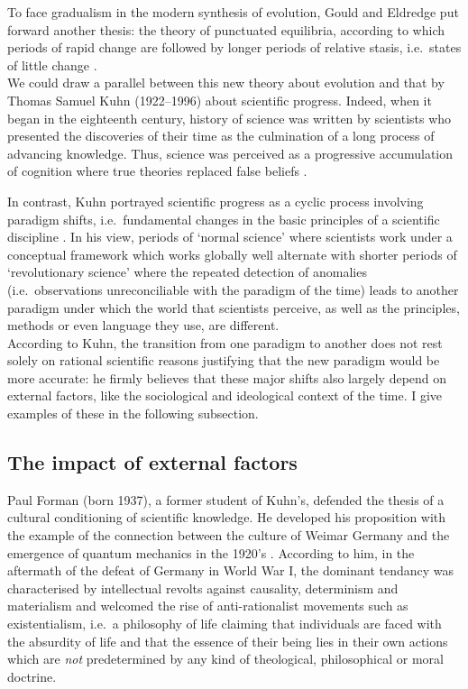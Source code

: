 To face gradualism in the modern synthesis of evolution, Gould and Eldredge put forward another thesis: the theory of punctuated equilibria, according to which periods of rapid change are followed by longer periods of relative stasis, i.e.\ states of little change \citep{gould1972punctuated}.\\

We could draw a parallel between this new theory about evolution and that by Thomas Samuel Kuhn (1922--1996) about scientific progress.
Indeed, when it began in the eighteenth century, history of science was written by scientists who presented the discoveries of their time as the culmination of a long process of advancing knowledge.
Thus, science was perceived as a progressive accumulation of cognition where true theories replaced false beliefs \citep{golinski2008making}.

In contrast, Kuhn portrayed scientific progress as a cyclic process involving paradigm shifts, i.e.\ fundamental changes in the basic principles of a scientific discipline \citep{kuhn1962structure}.
In his view, periods of ‘normal science’ where scientists work under a conceptual framework which works globally well alternate with shorter periods of ‘revolutionary science’ where the repeated detection of anomalies (i.e.\ observations unreconciliable with the paradigm of the time) leads to another paradigm under which the world that scientists perceive, as well as the principles, methods or even language they use, are different.\\

According to Kuhn, the transition from one paradigm to another does not rest solely on rational scientific reasons justifying that the new paradigm would be more accurate: he firmly believes that these major shifts also largely depend on external factors, like the sociological and ideological context of the time. I give examples of these in the following subsection.








\subsection{The impact of external factors} 



Paul Forman (born 1937), a former student of Kuhn's, defended the thesis of a cultural conditioning of scientific knowledge.
He developed his proposition with the example of the connection between the culture of Weimar Germany and the emergence of quantum mechanics in the 1920's \citep{forman1971weimar}.
According to him, in the aftermath of the defeat of Germany in World War I, the dominant tendancy was characterised by intellectual revolts against causality, determinism and materialism and welcomed the rise of anti-rationalist movements such as existentialism, i.e.\ a philosophy of life claiming that individuals are faced with the absurdity of life and that the essence of their being lies in their own actions which are \textit{not} predetermined by any kind of theological, philosophical or moral doctrine.

